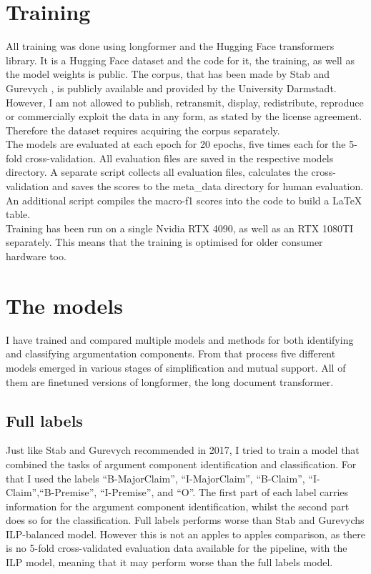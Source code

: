 \documentclass[12]{article}
\theoremstyle{mytheoremstyle}
\theoremstyle{mytheoremstyle}
\theoremstyle{myproblemstyle}
\begin{document}
  \section{Training\dotfill}
  All training was done using longformer\cite{beltagy2020longformer} and the Hugging Face transformers library. 
  It is a Hugging Face dataset and the code for it, the training, as well as the model weights is public. 
  The corpus, that has been made by Stab and Gurevych \cite{stab-gurevych-2017-parsing}, is publicly available and provided by the University Darmstadt. 
  However, I am not allowed to publish, retransmit, display, redistribute, reproduce or commercially exploit the data in any form, as stated by the license agreement. 
  Therefore the dataset requires acquiring the corpus separately.\\
  The models are evaluated at each epoch for 20 epochs, five times each for the 5-fold cross-validation. 
  All evaluation files are saved in the respective models directory. 
  A separate script collects all evaluation files, calculates the cross-validation and saves the scores to the meta\_data directory for human evaluation. 
  An additional script compiles the macro-f1 scores into the code to build a LaTeX table.\\
  Training has been run on a single Nvidia RTX 4090, as well as an RTX 1080TI separately. This means that the training is optimised for older consumer hardware too.

  \section{The models}
  I have trained and compared multiple models and methods for both identifying and classifying argumentation components. 
  From that process five different models emerged in various stages of simplification and mutual support. 
  All of them are finetuned versions of longformer\cite{beltagy2020longformer}, the long document transformer. 
  \subsection{Full labels} \label{full labels}
  Just like Stab and Gurevych recommended in 2017, I tried to train a model that combined the tasks of argument component identification and classification. For that I used the labels ``B-MajorClaim'', ``I-MajorClaim'', ``B-Claim'', ``I-Claim'',``B-Premise'', ``I-Premise'', and ``O''. 
  The first part of each label carries information for the argument component identification, whilst the second part does so for the classification. 
  Full labels performs worse than Stab and Gurevychs ILP-balanced model\cite{stab-gurevych-2017-parsing}. 
  However this is not an apples to apples comparison, as there is no 5-fold cross-validated evaluation data available for the pipeline, with the ILP model, meaning that it may perform worse than the full labels model. 
\end{document}
